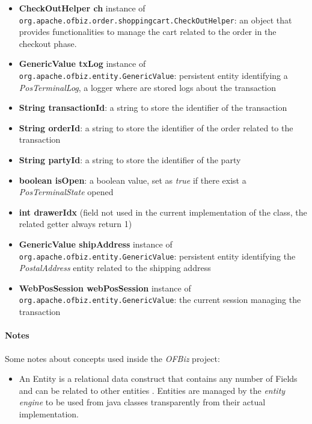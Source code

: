 \begin{itemize}
    \item \textbf{CheckOutHelper ch} instance of \\ \texttt{org.apache.ofbiz.order.shoppingcart.CheckOutHelper}: an object that provides functionalities to manage the cart related to the order in the checkout phase.
    \item \textbf{GenericValue txLog} instance of \\ \texttt{org.apache.ofbiz.entity.GenericValue}: persistent entity identifying a \emph{PosTerminalLog}, a logger where are stored logs about the transaction
    \item \textbf{String transactionId}: a string to store the identifier of the transaction
    \item \textbf{String orderId}: a string to store the identifier of the order related to the transaction
    \item \textbf{String partyId}: a string to store the identifier of the party
    \item \textbf{boolean isOpen}: a boolean value, set as \emph{true} if there exist a \emph{PosTerminalState} opened
    \item \textbf{int drawerIdx} (field not used in the current implementation of the class, the related getter always return 1)
    \item \textbf{GenericValue shipAddress} instance of \\ \texttt{org.apache.ofbiz.entity.GenericValue}: persistent entity identifying the \emph{PostalAddress} entity related to the shipping address
    \item \textbf{WebPosSession webPosSession} instance of \\ \texttt{org.apache.ofbiz.entity.GenericValue}: the current session managing the transaction
\end{itemize}

\paragraph{Notes} Some notes about concepts used inside the \emph{OFBiz} project:
\begin{itemize}
 	\item An Entity is a relational data construct that contains any number of Fields and can be related to other entities \cite{OFBiz}. Entities are managed by the \emph{entity engine} to be used from java classes transparently from their actual implementation.
\end{itemize}